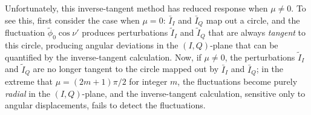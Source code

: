 Unfortunately, this inverse-tangent method
has reduced response when $\mu \neq 0$.
To see this, first consider the case when $\mu = 0$:
$\bar{I}_I$ and $\bar{I}_Q$ map out a circle, and
the fluctuation $\tilde{\phi}_0 \cos\nu'$
produces perturbations $\tilde{I}_I$ and $\tilde{I}_Q$
that are always \emph{tangent} to this circle,
producing angular deviations in the $(I, Q)$-plane
that can be quantified by the inverse-tangent calculation.
Now, if $\mu \neq 0$, the perturbations $\tilde{I}_I$ and $\tilde{I}_Q$
are no longer tangent to the circle mapped out by $\bar{I}_I$ and $\bar{I}_Q$;
in the extreme that $\mu = (2m + 1) \pi / 2$ for integer $m$,
the fluctuations become purely \emph{radial} in the $(I, Q)$-plane, and
the inverse-tangent calculation, sensitive only to angular displacements,
fails to detect the fluctuations.


